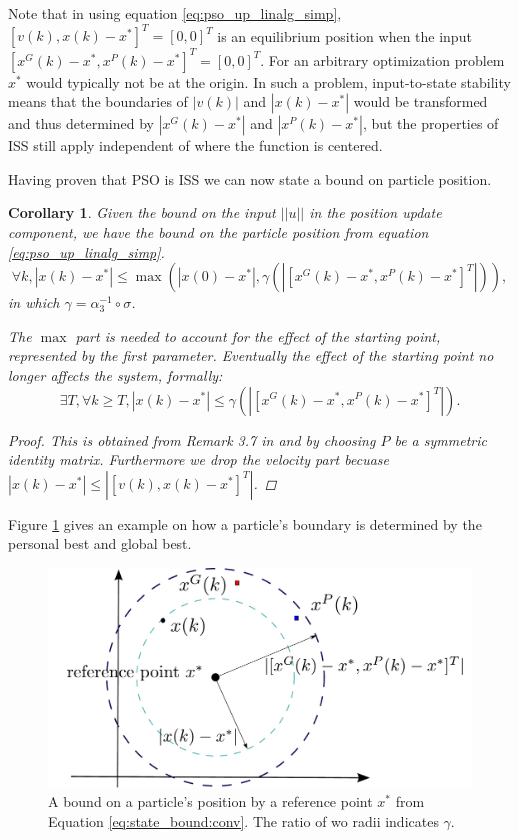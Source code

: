 \documentclass{sig-alternate}
\newtheorem{mycoro}{Corollary}
\begin{document}
Note that in using equation \eqref{eq:pso_up_linalg_simp},
$ [ v(k), x(k) - x^{*} ]^{T} = [0, 0]^{T} $ is an equilibrium position when the input $ [ x^{G}(k) - x^{*} , x^{P}(k) - x^{*} ]^{T} = [0, 0]^{T} $.
For an arbitrary optimization problem $ x^{*} $ would typically not be at the origin. 
In such a problem, input-to-state stability means that the boundaries of $ | v(k) | $ and $ | x(k) - x^{*} | $ would be transformed and thus determined by $ | x^{G}(k) - x^{*} | $ and $ | x^{P}(k) - x^{*} | $,
but the properties of ISS still apply independent of where the function is centered.

Having proven that PSO is ISS we can now state a bound on particle position.

\begin{mycoro}
\label{coro:state_bound}
Given the bound on the input $ || u || $ in the position update component, we have the bound on the particle position from equation \eqref{eq:pso_up_linalg_simp}.
\begin{equation}
\label{eq:state_bound}
\forall k, 
| x(k) - x^{*} | \leq \max ( | x(0) - x^{*} | , \gamma ( | [ x^{G}(k) - x^{*}, x^{P}(k) - x^{*} ]^{T} | ) ),
\end{equation}
in which $ \gamma = \alpha_{3}^{-1} \circ \sigma $.

The $ \max $ part is needed to account for the effect of the starting point, represented by the first parameter. Eventually the effect of the starting point no longer affects the system, formally:
\begin{equation}
\label{eq:state_bound:conv}
\exists T, \forall k \geq T, 
|  x(k) - x^{*} | \leq \gamma ( | [ x^{G}(k) - x^{*}, x^{P}(k) - x^{*} ]^{T} | ).
\end{equation}
\begin{proof}
This is obtained from Remark 3.7 in \cite{Jiang2001857} and by choosing $ P $ be a symmetric identity matrix.
Furthermore we drop the velocity part becuase $ | x(k) - x^{*} | \leq | [ v(k), x(k) - x^{*} ]^{T} | $.
\end{proof}
\end{mycoro}

Figure \ref{fig:boundary} gives an example on how a particle's boundary is determined by the personal best and global best.

\begin{figure}
\centering
\includegraphics[width=0.8\linewidth]{./boundary}
\caption{A bound on a particle's position by a reference point $ x^{*} $ from Equation \ref{eq:state_bound:conv}.
The ratio of wo radii indicates $ \gamma $.}
\label{fig:boundary}
\end{figure}
\end{document}
